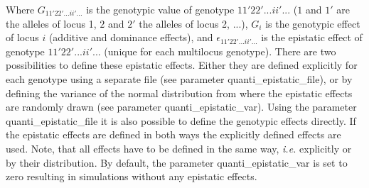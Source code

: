 \documentclass[letterpaper,12pt,oneside]{book}
\begin{document}
Where $G_{11'22'...ii'...}$ is the genotypic value of genotype ${11'22'...ii'...}$ ($1$ and $1'$ are the alleles of locus 1, $2$ and $2'$ the alleles of locus 2, ...), $G_{i}$ is the genotypic effect of locus $i$ (additive and dominance effects), and $\epsilon_{11'22'...ii'...}$ is the epistatic effect of genotype $11'22'...ii'...$ (unique for each multilocus genotype). There are two possibilities to define these epistatic effects. Either they are defined explicitly for each genotype using a separate file (see parameter \textsf{quanti\_epistatic\_file}), or by defining the variance of the normal distribution from where the epistatic effects are randomly drawn (see parameter \textsf{quanti\_epistatic\_var}). Using the parameter \textsf{quanti\_epistatic\_file} it is also possible to define the genotypic effects directly. If the epistatic effects are defined in both ways the explicitly defined effects are used. Note, that all effects have to be defined in the same way, \textit{i.e.} explicitly or by their distribution. By default, the parameter \textsf{quanti\_epistatic\_var} is set to zero resulting in simulations without any epistatic effects.
\end{document}

